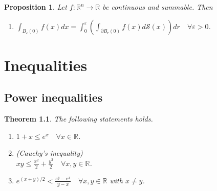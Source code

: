 \documentclass[11pt,a4paper]{report}
\newtheorem{theorem}{Theorem}[section]
\newtheorem{proposition}[theorem]{Proposition}
\theoremstyle{definition}
\begin{document}
\begin{proposition}

	Let $f: \mathbb{R}^{n} \rightarrow \mathbb{R}$ be continuous and summable. 
	Then
	\begin{enumerate}[label=(\alph*)]
	\rm\item $\displaystyle \int_{B_{\varepsilon}(0)} f(x) dx = \int_{0}^{\varepsilon} \left( \int_{\partial B_r(0)} f(x) d\mathcal{S}(x) \right) dr \quad \forall \varepsilon>0$.
	\end{enumerate}
	\end{proposition}

\chapter{Inequalities} 

\section{Power inequalities}

\begin{theorem}
	The following statements holds.
	\begin{enumerate}[label=(\alph*)] 
		\rm\item $1 + x \leq e^{x} \quad \forall x \in \mathbb{R}$.
		\rm\item (Cauchy's inequality) \\[0.1cm]
		$\displaystyle xy \leq \frac{x^{2}}{2}+\frac{y^{2}}{2} \quad \forall x, y \in \mathbb{R}$. 
		\rm\item $\displaystyle e^{(x + y)/2} < \frac{e^{y} - e^{x}}{y - x} \quad \forall x, y \in \mathbb{R}$ with $x \neq y$.
	\end{enumerate}
	
\end{theorem}
\end{document}
